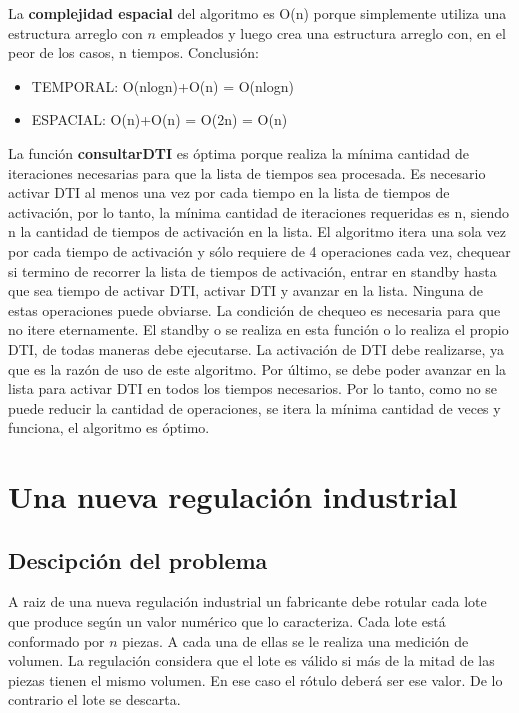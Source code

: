 \documentclass{article}
\begin{document}
La \textbf{complejidad espacial} del algoritmo es O(n) porque simplemente utiliza una estructura arreglo 
con \(n\) empleados y luego crea una estructura arreglo con, en el peor de los casos, n tiempos. Conclusión:

\begin{itemize}
    \item TEMPORAL: O(nlogn)+O(n) = O(nlogn)
    \item ESPACIAL: O(n)+O(n) = O(2n) = O(n)
\end{itemize}

La función \textbf{consultarDTI} es óptima porque realiza la mínima cantidad de iteraciones necesarias para que la 
lista de tiempos sea procesada. Es necesario activar DTI al menos una vez por cada tiempo en 
la lista de tiempos de activación, por lo tanto, la mínima cantidad de iteraciones 
requeridas es n, siendo n la cantidad de tiempos de activación en la lista. 
El algoritmo itera una sola vez por cada tiempo de activación y sólo requiere de 4 
operaciones cada vez, chequear si termino de recorrer la lista de tiempos de activación, 
entrar en standby hasta que sea tiempo de activar DTI, activar DTI y avanzar en la lista. 
Ninguna de estas operaciones puede obviarse. La condición de chequeo es necesaria para que no 
itere eternamente. El standby o se realiza en esta función o lo realiza el propio DTI, 
de todas maneras debe ejecutarse. La activación de DTI debe realizarse, ya que es la razón 
de uso de este algoritmo. 
Por último, se debe poder avanzar en la lista para activar DTI en todos los tiempos necesarios. 
Por lo tanto, como no se puede reducir la cantidad de operaciones, 
se itera la mínima cantidad de veces y funciona, el algoritmo es óptimo.


\newpage
\section{Una nueva regulación industrial}

\subsection{Descipción del problema}
A raiz de una nueva regulación industrial un fabricante debe rotular cada lote que produce según un valor numérico que lo caracteriza. 
Cada lote está conformado por \(n\) piezas. A cada una de ellas se le realiza una medición de volumen. La regulación considera que el lote es válido si más de la mitad de las piezas tienen el mismo volumen. 
En ese caso el rótulo deberá ser ese valor. De lo contrario el lote se descarta.
\end{document}
